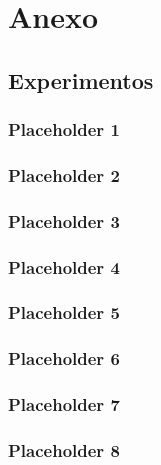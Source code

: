 \section{Anexo}

\subsection{Experimentos}
\label{sec:experimentos}

\subsubsection{Placeholder 1}
\label{vega_altair_plot_time}

\subsubsection{Placeholder 2}
\label{pygal_plot_time}

\subsubsection{Placeholder 3}
\label{vega_altair_plot_plus_build_time}

\subsubsection{Placeholder 4}
\label{vega_altair_plot_space}

\subsubsection{Placeholder 5}
\label{pygal_plot_space}

\subsubsection{Placeholder 6}
\label{vega_altair_memory_allocation}

\subsubsection{Placeholder 7}
\label{pygal_memory_allocation}

\subsubsection{Placeholder 8}
\label{anexo_sdsl4py}
